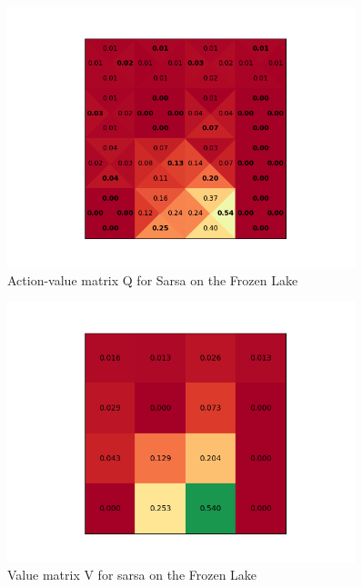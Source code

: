 \documentclass{article}
\begin{document}
\begin{figure}[H]
\centering
\includegraphics[width=0.9\textwidth]{figures/Q_sarsa_slippery.png}
\caption{Action-value matrix Q for Sarsa on the Frozen Lake}
\label{fig:Q_sarsa}
\end{figure}

\begin{figure}[H]
\centering
\includegraphics[width=0.9\textwidth]{figures/V_sarsa_slippery.png}
\caption{Value matrix V for sarsa on the Frozen Lake}
\label{fig:V_sarsa}
\end{figure}
\end{document}
